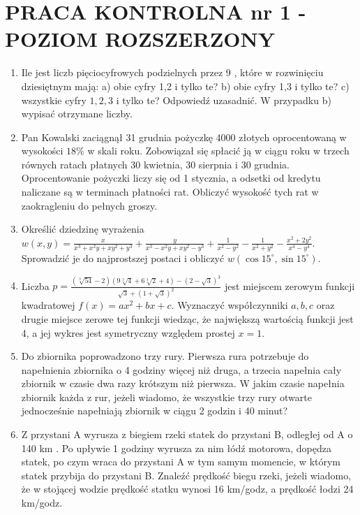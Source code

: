 \documentclass[10pt]{article}
\begin{document}
\section*{PRACA KONTROLNA nr 1 - POZIOM ROZSZERZONY}
\begin{enumerate}
  \item Ile jest liczb pięciocyfrowych podzielnych przez 9 , które w rozwinięciu dziesiętnym mają: a) obie cyfry 1,2 i tylko te? b) obie cyfry 1,3 i tylko te? c) wszystkie cyfry $1,2,3$ i tylko te? Odpowiedź uzasadnić. W przypadku b) wypisać otrzymane liczby.
  \item Pan Kowalski zaciągnął 31 grudnia pożyczkę 4000 złotych oprocentowaną w wysokości $18 \%$ w skali roku. Zobowiązał się spłacić ją w ciągu roku w trzech równych ratach płatnych 30 kwietnia, 30 sierpnia i 30 grudnia. Oprocentowanie pożyczki liczy się od 1 stycznia, a odsetki od kredytu naliczane są w terminach płatności rat. Obliczyć wysokość tych rat w zaokragleniu do pełnych groszy.
  \item Określić dziedzinę wyrażenia\\
$w(x, y)=\frac{x}{x^{3}+x^{2} y+x y^{2}+y^{3}}+\frac{y}{x^{3}-x^{2} y+x y^{2}-y^{3}}+\frac{1}{x^{2}-y^{2}}-\frac{1}{x^{2}+y^{2}}-\frac{x^{2}+2 y^{2}}{x^{4}-y^{4}}$.\\
Sprowadzić je do najprostszej postaci i obliczyć $w\left(\cos 15^{\circ}, \sin 15^{\circ}\right)$.
  \item Liczba $p=\frac{(\sqrt[3]{54}-2)(9 \sqrt[3]{4}+6 \sqrt[3]{2}+4)-(2-\sqrt{3})^{3}}{\sqrt{3}+(1+\sqrt{3})^{2}}$ jest miejscem zerowym funkcji kwadratowej $f(x)=a x^{2}+b x+c$. Wyznaczyć współczynniki $a, b, c$ oraz drugie miejsce zerowe tej funkcji wiedząc, że największą wartością funkcji jest 4, a jej wykres jest symetryczny względem prostej $x=1$.
  \item Do zbiornika poprowadzono trzy rury. Pierwsza rura potrzebuje do napełnienia zbiornika o 4 godziny więcej niż druga, a trzecia napełnia cały zbiornik w czasie dwa razy krótszym niż pierwsza. W jakim czasie napełnia zbiornik każda z rur, jeżeli wiadomo, że wszystkie trzy rury otwarte jednocześnie napełniają zbiornik w ciągu 2 godzin i 40 minut?
  \item Z przystani A wyrusza z biegiem rzeki statek do przystani B, odległej od A o 140 km . Po upływie 1 godziny wyrusza za nim łódź motorowa, dopędza statek, po czym wraca do przystani A w tym samym momencie, w którym statek przybija do przystani B. Znaleźć prędkość biegu rzeki, jeżeli wiadomo, że w stojącej wodzie prędkość statku wynosi 16 km/godz, a prędkość łodzi 24 km/godz.
\end{enumerate}
\end{document}
